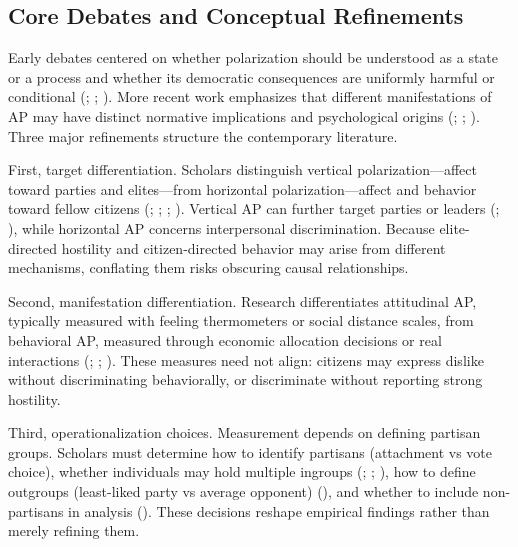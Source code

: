 \documentclass[
  12pt,
  a4paper,
  DIV=11,
  numbers=noendperiod]{scrartcl}
\begin{document}
\subsection{Core Debates and Conceptual
Refinements}\label{sec-core-debates}

Early debates centered on whether polarization should be understood as a
state or a process and whether its democratic consequences are uniformly
harmful or conditional (; ; ). More
recent work emphasizes that different manifestations of AP may have
distinct normative implications and psychological origins
(;
; ).
Three major refinements structure the contemporary literature.

First, target differentiation. Scholars distinguish vertical
polarization---affect toward parties and elites---from horizontal
polarization---affect and behavior toward fellow citizens
(;
;
;
).
Vertical AP can further target parties or leaders
(;
), while
horizontal AP concerns interpersonal discrimination. Because
elite-directed hostility and citizen-directed behavior may arise from
different mechanisms, conflating them risks obscuring causal
relationships.

Second, manifestation differentiation. Research differentiates
attitudinal AP, typically measured with feeling thermometers or social
distance scales, from behavioral AP, measured through economic
allocation decisions or real interactions
(;
;
). These
measures need not align: citizens may express dislike without
discriminating behaviorally, or discriminate without reporting strong
hostility.

Third, operationalization choices. Measurement depends on defining
partisan groups. Scholars must determine how to identify partisans
(attachment vs vote choice), whether individuals may hold multiple
ingroups (; ;
), how to define outgroups
(least-liked party vs average opponent)
(), and whether to
include non-partisans in analysis
(). These
decisions reshape empirical findings rather than merely refining them.
\end{document}
